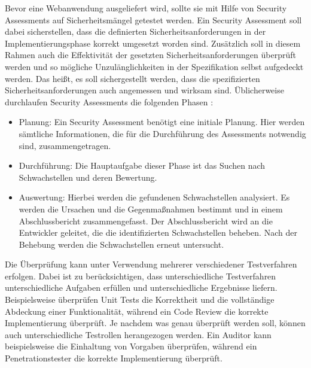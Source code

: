 \documentclass[12pt,oneside,a4paper,parskip,pointlessnumbers]{scrbook}
\begin{document}
  Bevor eine Webanwendung ausgeliefert wird, sollte sie mit Hilfe von Security Assessments  auf Sicherheitsmängel getestet werden.
  Ein Security Assessment soll dabei sicherstellen, dass die definierten Sicherheitsanforderungen in der
  Implementierungsphase korrekt umgesetzt worden sind. Zusätzlich soll in diesem Rahmen auch die
  Effektivität der gesetzten Sicherheitsanforderungen überprüft werden und so mögliche Unzulänglichkeiten
  in der Spezifikation selbst aufgedeckt werden. Das heißt, es soll sichergestellt werden, dass die spezifizierten Sicherheitsanforderungen auch angemessen und wirksam sind.
  Üblicherweise durchlaufen Security Assessments die folgenden Phasen \cite{BSI}:
  \begin{itemize}
    \item Planung: Ein Security Assessment benötigt eine initiale Planung. Hier werden sämtliche
    Informationen, die für die Durchführung des Assessments notwendig sind, zusammengetragen.
    \item Durchführung: Die Hauptaufgabe dieser Phase ist das Suchen nach Schwachstellen und deren
    Bewertung.
    \item Auswertung: Hierbei werden die gefundenen Schwachstellen analysiert. Es werden die Ursachen
    und die Gegenmaßnahmen bestimmt und in einem Abschlussbericht zusammengefasst. Der
    Abschlussbericht wird an die Entwickler geleitet, die die identifizierten Schwachstellen beheben.
    Nach der Behebung werden die Schwachstellen erneut untersucht.
  \end{itemize}
  Die Überprüfung kann unter Verwendung mehrerer verschiedener Testverfahren erfolgen. Dabei ist zu
  berücksichtigen, dass unterschiedliche Testverfahren unterschiedliche Aufgaben erfüllen und
  unterschiedliche Ergebnisse liefern. Beispielsweise überprüfen Unit Tests die Korrektheit und die
  vollständige Abdeckung einer Funktionalität, während ein Code Review die korrekte Implementierung
  überprüft. Je nachdem was genau überprüft werden soll, können auch unterschiedliche Testrollen
  herangezogen werden. Ein Auditor kann beispielsweise die Einhaltung von Vorgaben überprüfen, während
  ein Penetrationstester die korrekte Implementierung überprüft.
\end{document}
